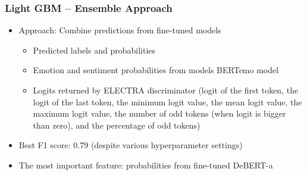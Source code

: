 \documentclass[aspectratio=149]{beamer}
\begin{document}
\begin{frame}
    \frametitle{Light GBM – Ensemble Approach}
    \begin{itemize}
        \item Approach: Combine predictions from fine-tuned models
        \begin{itemize}
            \item Predicted labels and probabilities
            \item Emotion and sentiment probabilities from models BERTemo model
            \item Logits returned by ELECTRA discriminator (logit of the first token, the logit of the last token, the minimum logit value, the mean logit value, the maximum logit value, the number of odd tokens (when logit is bigger than zero), and the percentage of odd tokens)
        \end{itemize}
        \item Best F1 score: 0.79 (despite various hyperparameter settings)
        \item The most important feature: probabilities from fine-tuned DeBERT-a
    \end{itemize}
\end{frame}
\end{document}
